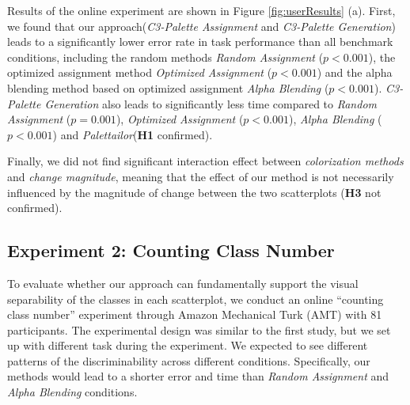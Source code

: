Results of the online experiment are shown in Figure \ref{fig:userResults} (a).
First, we found that our approach(\emph{C3-Palette Assignment} and \emph{C3-Palette Generation}) leads to a significantly lower error rate in task performance than all benchmark conditions, including the random methods \emph{Random Assignment} (\emph{$p < 0.001$}), the optimized assignment method \emph{Optimized Assignment} (\emph{$p < 0.001$}) and the alpha blending method based on optimized assignment \emph{Alpha Blending} (\emph{$p < 0.001$}). \emph{C3-Palette Generation} also leads to significantly less time compared to \emph{Random Assignment} (\emph{$p = 0.001$}), \emph{Optimized Assignment} (\emph{$p < 0.001$}), \emph{Alpha Blending} (\emph{$p < 0.001$}) and \emph{Palettailor}(\textbf{H1} confirmed).


Finally, we did not find significant interaction effect between \emph{colorization methods} and \emph{change magnitude}, meaning that the effect of our method is not necessarily influenced by the magnitude of change between the two scatterplots (\textbf{H3} not confirmed).


\subsection{Experiment 2: Counting Class Number}
\label{subsec:onlinestudy2}
To evaluate whether our approach can fundamentally support the visual separability of the classes in each scatterplot, we conduct an online ``counting class number'' experiment through Amazon Mechanical Turk (AMT) with 81 participants. The experimental design was similar to the first study, but we set up with different task during the experiment.
We expected to see different patterns of the discriminability across different conditions. Specifically, our methods would lead to a shorter error and time than \emph{Random Assignment} and \emph{Alpha Blending} conditions.


